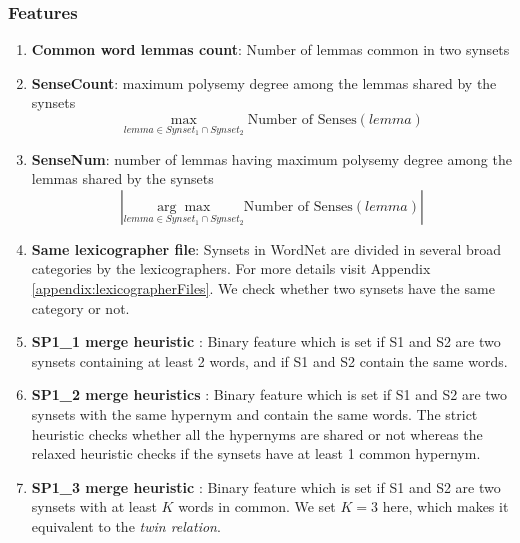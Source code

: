 \begin{comment}
1: 0 2.0794415416798357
1: 1 0.8
1: 2 0.0984253784312118
1: 3 0.27255086834319175
1: 4 1.9033026456664381
1: 5 530.0
1: 6 0.14593596059113303
1: 7 0.17427385892116182
------------------------------
1: 0 1.742969305058623
1: 1 0.7272727272727273
1: 2 0.09047925594509129
1: 3 0.2561841672684562
1: 4 1.9033026456664381
1: 5 170.0
1: 6 0.06958762886597938
1: 7 0.14709677419354839
\end{comment}

\subsubsection{Features}
\begin{enumerate}
\item \textbf{Common word lemmas count}: Number of lemmas common in two synsets
\item \textbf{SenseCount}: maximum polysemy degree among the lemmas shared by the synsets
\begin{equation*}
\underset{lemma \in Synset_1 \cap Synset_2}{\max} \mbox{Number of Senses}(lemma)
\end{equation*}

\item \textbf{SenseNum}: number of lemmas having maximum polysemy degree among the lemmas shared by the synsets
\begin{equation*}
\left|\underset{lemma \in Synset_1 \cap Synset_2}{\arg\max} \mbox{Number of Senses}(lemma)\right|
\end{equation*}

\item \textbf{Same lexicographer file}: Synsets in WordNet are divided in several broad categories by the lexicographers. For more details visit Appendix \ref{appendix:lexicographerFiles}.
We check whether two synsets have the same category or not. 


\item \textbf{SP1\_1 merge heuristic} \citep{Mihalcea01ez.wordnet:principles}: Binary feature which is set if S1 and S2 are two synsets containing at least 2 words, and if S1 and S2 contain the same words.
\item \textbf{SP1\_2 merge heuristics} \citep{Mihalcea01ez.wordnet:principles}: Binary feature which is set if S1 and S2 are two synsets with the same hypernym and contain the same words. The strict heuristic checks whether all the hypernyms are shared or not whereas the relaxed heuristic checks if the synsets have at least 1 common hypernym.
\item \textbf{SP1\_3 merge heuristic} \citep{Mihalcea01ez.wordnet:principles}: Binary feature which is set if S1 and S2 are two synsets with at least $K$ words in common. We set $K=3$ here, which makes it equivalent to the \textit{twin relation}.


\end{enumerate}
